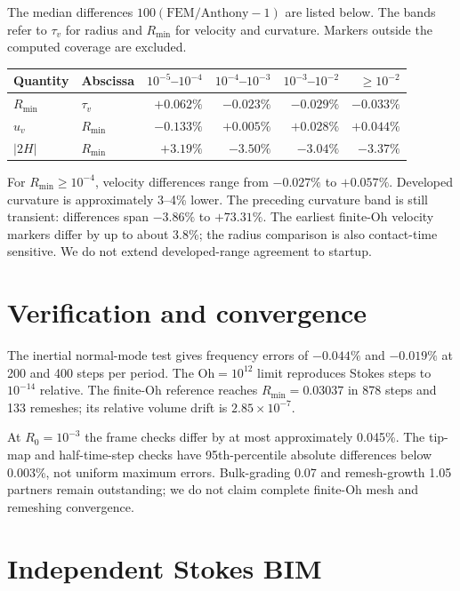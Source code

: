 \documentclass[10pt,a4paper]{article}
\newcommand{\Oh}{\mathrm{Oh}}
\newcommand{\Rmin}{R_{\min}}
\begin{document}
The median differences $100(\mathrm{FEM}/\mathrm{Anthony}-1)$ are listed
below. The bands refer to $\tau_v$ for radius and $\Rmin$ for velocity
and curvature. Markers outside the computed coverage are excluded.
\begin{center}
\small
\begin{tabular}{llrrrr}
\toprule
Quantity & Abscissa & $10^{-5}$--$10^{-4}$ & $10^{-4}$--$10^{-3}$ & $10^{-3}$--$10^{-2}$ & $\geq10^{-2}$ \\
\midrule
$\Rmin$ & $\tau_v$ & $+0.062\%$ & $-0.023\%$ & $-0.029\%$ & $-0.033\%$ \\
$u_v$ & $\Rmin$ & $-0.133\%$ & $+0.005\%$ & $+0.028\%$ & $+0.044\%$ \\
$\lvert2H\rvert$ & $\Rmin$ & $+3.19\%$ & $-3.50\%$ & $-3.04\%$ & $-3.37\%$ \\
\bottomrule
\end{tabular}
\end{center}
For $\Rmin\geq10^{-4}$, velocity differences range from $-0.027\%$ to
$+0.057\%$. Developed curvature is approximately 3--4\% lower.
The preceding curvature band is still transient: differences span
$-3.86\%$ to $+73.31\%$. The earliest finite-Oh velocity markers differ
by up to about 3.8\%; the radius comparison is also contact-time sensitive.
We do not extend developed-range agreement to startup.

\section{Verification and convergence}
The inertial normal-mode test gives frequency errors of $-0.044\%$ and
$-0.019\%$ at 200 and 400 steps per period. The $\Oh=10^{12}$ limit
reproduces Stokes steps to $10^{-14}$ relative. The finite-Oh reference
reaches $\Rmin=0.03037$ in 878 steps and 133 remeshes; its relative
volume drift is $2.85\times10^{-7}$.

At $R_0=10^{-3}$ the frame checks differ by at most approximately 0.045\%.
The tip-map and half-time-step checks have 95th-percentile absolute
differences below 0.003\%, not uniform maximum errors.
Bulk-grading 0.07 and remesh-growth 1.05 partners remain outstanding;
we do not claim complete finite-Oh mesh and remeshing convergence.


\clearpage
\section{Independent Stokes BIM}

\end{document}
